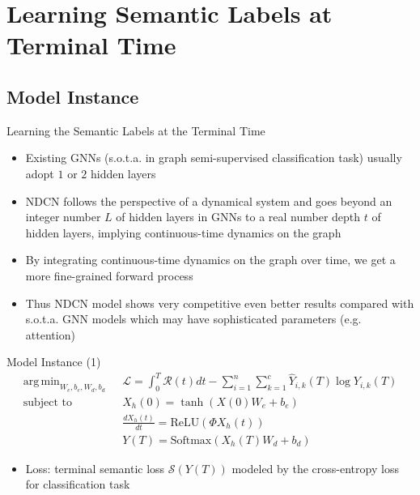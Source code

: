 \documentclass{beamer}
\DeclareMathOperator*{\argmin}{arg\,min}
\begin{document}
\section{Learning Semantic Labels at Terminal Time}
\subsection{Model Instance}
\begin{frame}{Learning the Semantic Labels at the Terminal Time}
\begin{itemize}
\item Existing GNNs (s.o.t.a. in graph semi-supervised classification task) usually adopt $1$ or $2$ hidden layers
\item NDCN follows the perspective of a dynamical system and goes beyond an integer number $L$ of hidden layers in GNNs to a real number depth $t$ of hidden layers, implying continuous-time dynamics on the graph
\item By integrating continuous-time dynamics on the graph over time, we get a more fine-grained forward process
\item Thus NDCN model shows very competitive even better results compared with s.o.t.a. GNN models which may have sophisticated parameters (e.g. attention)
\end{itemize}
\end{frame}

\begin{frame}{Model Instance (1)}\[
\begin{split}
\argmin_{W_e,b_e,W_d,b_d}\text{ }&\mathcal{L}=\int_0^T\mathcal{R}(t)dt-\sum_{i=1}^n\sum_{k=1}^c\hat{Y}_{i,k}(T)\log Y_{i,k}(T)\\
\text{subject to }&X_h(0)=\tanh(X(0)W_e+b_e)\\
&\frac{dX_h(t)}{dt}=\text{ReLU}(\Phi X_h(t))\\
&Y(T)=\text{Softmax}(X_h(T)W_d+b_d)
\end{split}
\]
\begin{itemize}
\item Loss: terminal semantic loss $\mathcal{S}(Y(T))$ modeled by the cross-entropy loss for classification task
\end{itemize}
\end{frame}
\end{document}
